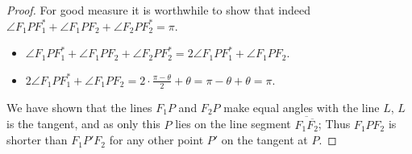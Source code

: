 \documentclass[12pt]{article}
\newcommand{\ds}{\displaystyle}
\theoremstyle{plain}
\begin{document}
\begin{proof}
  For good measure it is worthwhile to show that indeed $ \ds \angle F_{1}PF_{1}^{*} + \angle F_{1}PF_{2} + \angle F_{2}PF_{2}^{*} = \pi $.

  \begin{itemize}
    \item  $ \ds \angle F_{1}PF_{1}^{*} + \angle F_{1}PF_{2} + \angle F_{2}PF_{2}^{*} = 2\angle F_{1}PF_{1}^{*} + \angle F_{1}PF_{2} $.
    \item  $ \ds 2\angle F_{1}PF_{1}^{*} + \angle F_{1}PF_{2} = 2 \cdot \frac{\pi - \theta}{2} + \theta = \pi - \theta + \theta = \pi $.
  \end{itemize}

  We have shown that the lines $F_1P$ and $F_2P$ make equal angles with the line $ L $, $ L $ is the tangent,
  and as only this $ P $ lies on the line segment $ \overline{F_{1}\overline{F_{2}}} $;
  Thus $F_1PF_2$ is shorter than $F_1P'F_2$ for any other point $P'$ on the tangent at $P$.
\end{proof}
\end{document}
